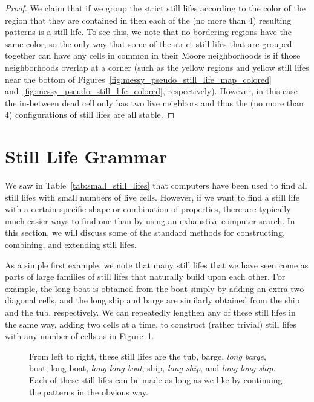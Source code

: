 \begin{proof}
	We claim that if we group the strict still lifes according to the color of the region that they are contained in then each of the (no more than $4$) resulting patterns is a still life. To see this, we note that no bordering regions have the same color, so the only way that some of the strict still lifes that are grouped together can have any cells in common in their Moore neighborhoods is if those neighborhoods overlap at a corner (such as the yellow regions and yellow still lifes near the bottom of Figures~\ref{fig:messy_pseudo_still_life_map_colored} and~\ref{fig:messy_pseudo_still_life_colored}, respectively). However, in this case the in-between dead cell only has two live neighbors and thus the (no more than $4$) configurations of still lifes are all stable.
\end{proof}


\section{Still Life Grammar}\label{sec:still_life_grammar}

We saw in Table~\ref{tab:small_still_lifes} that computers have been used to find all still lifes with small numbers of live cells. However, if we want to find a still life with a certain specific shape or combination of properties, there are typically much easier ways to find one than by using an exhaustive computer search. In this section, we will discuss some of the standard methods for constructing, combining, and extending still lifes.

As a simple first example, we note that many still lifes that we have seen come as parts of large families of still lifes that naturally build upon each other. For example, the long boat is obtained from the boat simply by adding an extra two diagonal cells, and the long ship and barge are similarly obtained from the ship and the tub, respectively. We can repeatedly lengthen any of these still lifes in the same way, adding two cells at a time, to construct (rather trivial) still lifes with any number of cells as in Figure~\ref{fig:tub_boat_ship}.

\begin{figure}[!htb]
	\centering{}
	\caption{From left to right, these still lifes are the tub, barge, \emph{long barge}, boat, long boat, \emph{long long boat}, ship, \emph{long ship}, and \emph{long long ship}. Each of these still lifes can be made as long as we like by continuing the patterns in the obvious way.}\label{fig:tub_boat_ship}
\end{figure}

